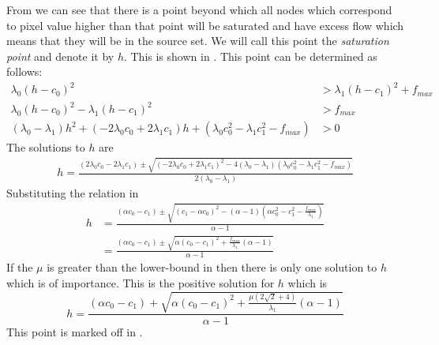 \begin{definition} From  we can see that there is a point beyond which all nodes which correspond to pixel value higher than that point will be saturated and have excess flow which means that they will be in the source set. We will call this point the \textit{saturation point} and denote it by $h$. This is shown in . This point can be determined as follows:
\begin{equation*}\begin{split}
	\lambda_0(h-c_0)^2 &> \lambda_1(h-c_1)^2 + f_{max} \\
	\lambda_0(h-c_0)^2 - \lambda_1(h-c_1)^2 &> f_{max} \\
	(\lambda_0-\lambda_1)h^2 + (-2\lambda_0 c_0 + 2\lambda_1 c_1)h + (\lambda_0 c_0^2 - \lambda_1 c_1^2-f_{max}) &> 0
\end{split}\end{equation*}
The solutions to $h$ are
\begin{equation*}\begin{split}
	h = \frac{ (2\lambda_0 c_0 - 2\lambda_1 c_1) \pm \sqrt{(-2\lambda_0 c_0 + 2\lambda_1 c_1)^2-4(\lambda_0-\lambda_1)(\lambda_0 c_0^2 - \lambda_1 c_1^2-f_{max})}}{2(\lambda_0-\lambda_1)}
\end{split}\end{equation*}
Substituting the relation in 
\begin{equation*}\begin{split}
	h &= \frac{(\alpha c_0-c_1)\pm\sqrt{(c_1-\alpha c_0)^2-(\alpha-1)(\alpha c_0^2-c_1^2-\frac{f_{max}}{\lambda_1})}}{\alpha-1}\\
	&= \frac{(\alpha c_0-c_1)\pm\sqrt{\alpha(c_0-c_1)^2+\frac{f_{max}}{\lambda_1}(\alpha-1)}}{\alpha-1}
\end{split}\end{equation*}
If the $\mu$ is greater than the lower-bound in  then there is only one solution to $h$ which is of importance. This is the positive solution for $h$ which is
\begin{equation}
	h = \frac{(\alpha c_0-c_1)+\sqrt{\alpha(c_0-c_1)^2+\frac{\mu(2\sqrt{2}+4)}{\lambda_1}(\alpha-1)}}{\alpha-1}
	\label{eq:h}
\end{equation}
This point is marked off in .
\end{definition}

